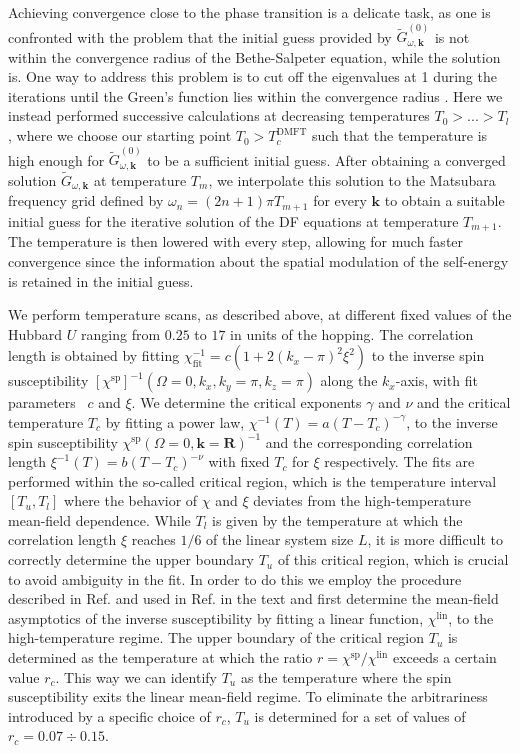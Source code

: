 \documentclass[aps,prb,twocolumn,amsmath,notitlepage,floatfix,footinbib,superscriptaddress,showpacs, showkeys]{revtex4-1}
\newcommand{\kay}{\mathbf{k}}
\begin{document}
\begin{appendix}
Achieving convergence close to the phase transition is a delicate task, as one is confronted with the problem that the initial guess provided by $\tilde{G}^{(0)}_{\omega,\kay}$ is not within the convergence radius of the Bethe-Salpeter equation, while the solution is. One way to address this problem is to cut off the eigenvalues at 1 during the iterations until the Green's function lies within the convergence radius \cite{Otsuki2014}. Here we instead performed successive calculations at decreasing temperatures $T_0 > ... > T_l$, where we choose our starting point $T_0 > T_c^{\mathrm{DMFT}}$ such that the temperature is high enough for $\tilde{G}^{(0)}_{\omega,\kay}$ to be a sufficient initial guess. 
After obtaining a converged solution $\tilde{G}_{\omega,\kay}$ at temperature $T_m$, we interpolate this solution to the Matsubara frequency grid defined by $\omega_n=(2n+1)\pi T_{m+1}$ for every $\kay$ to obtain a suitable initial guess for the iterative solution of the DF equations at temperature $T_{m+1}$. The temperature is then lowered with every step, allowing for much faster convergence since the information about the spatial modulation of the self-energy is retained in the initial guess.

We perform temperature scans, as described above, at different fixed values of the Hubbard $U$ ranging from $0.25$ to $17$ in units of the hopping. 
The correlation length is obtained by fitting $\chi_{\text{fit}}^{-1}=c(1+2(k_x-\pi)^{2}\xi^{2})$ to the inverse spin susceptibility $[\chi^{\text{sp}}]^{-1}(\Omega=0,k_x,k_y=\pi,k_z=\pi)$ along the $k_x$-axis, with fit parameters~\cite{Mack2011} $c$ and $\xi$. 
We determine the critical exponents $\gamma$ and $\nu$ and the critical temperature $T_c$ by fitting a power law, $\chi^{-1}(T)=a(T-T_c)^{-\gamma}$, to the inverse spin susceptibility $\chi^{\text{sp}}(\Omega=0,\kay=\mathbf{R})^{-1}$ and the corresponding correlation length $\xi^{-1}(T)=b(T-T_c)^{-\nu}$ with fixed $T_c$ for $\xi$ respectively. 
The fits are performed within the so-called critical region, which is the temperature interval $\left[T_u,T_l\right]$ where the behavior of $\chi$ and $\xi$ deviates from the high-temperature mean-field dependence. 
While $T_l$ is given by the temperature at which the correlation length $\xi$ reaches $1/6$ of the linear system size $L$, it is more difficult to correctly determine the upper boundary $T_u$ of this critical region, which is crucial to avoid ambiguity in the fit. 
In order to do this we employ the procedure described in Ref.  and used in Ref.  in the text and first determine the mean-field asymptotics of the inverse susceptibility by fitting a linear function, $\chi^{\text{lin}}$, to the high-temperature regime. 
The upper boundary of the critical region $T_u$ is determined as the temperature at which the ratio $r=\chi^{\text{sp}}/\chi^{\text{lin}}$ exceeds a certain value $r_c$. 
This way we can identify $T_u$ as the temperature where the spin susceptibility exits the linear mean-field regime. To eliminate the arbitrariness introduced by a specific choice of $r_c$, $T_u$ is determined for a set of values of $r_c=0.07 \div 0.15$. 


\end{appendix}
\end{document}

